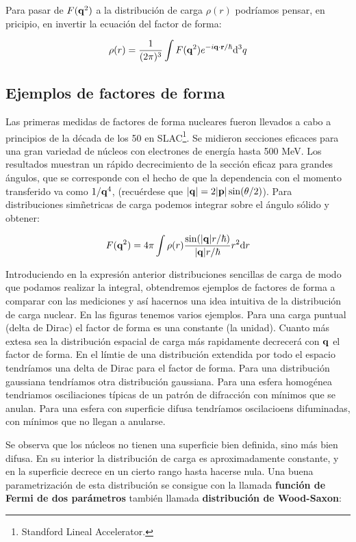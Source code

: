 Para pasar de $F(\mathbf{q}^2)$ a la distribución de carga $\rho(r)$ podríamos pensar, en pricipio, en invertir la ecuación del factor de forma:

\begin{equation}
    \rho(r)=\frac{1}{(2\pi)^3} \int F(\mathbf{q}^2) e^{-i \mathbf{q} \cdot \mathbf{r}/\hbar} \mathrm{d}^3 q
\end{equation}


\subsection{Ejemplos de factores de forma}

Las primeras medidas de factores de forma nucleares fueron llevados a cabo a principios de la década de los 50 en SLAC\footnote{Standford Lineal Accelerator.}. Se midieron secciones eficaces para una gran variedad de núcleos con electrones de energía hasta 500 MeV. Los resultados muestran un rápido decrecimiento de la sección eficaz para grandes ángulos, que se corresponde con el hecho de que la dependencia con el momento transferido va como $1/\mathbf{q}^4$, (recuérdese que $|\mathbf{q}|=2|\mathbf{p}| \sin (\theta /2)$). Para distribuciones simñetricas de carga podemos integrar sobre el ángulo sólido y obtener:

\begin{equation}
	F(\mathbf{q}^2) = 4 \pi \int \rho (r) \frac{\sin (|\mathbf{q}|r/\hbar)}{ |\mathbf{q}| r / \hbar} r^2 \mathrm{d} r
\end{equation}

Introduciendo en la expresión anterior distribuciones sencillas de carga de modo que podamos realizar la integral, obtendremos ejemplos de factores de forma a comparar con las mediciones y así hacernos una idea intuitiva de la distribución de carga nuclear. En las figuras tenemos varios ejemplos. Para una carga puntual (delta de Dirac) el factor de forma es una constante (la unidad). Cuanto más extesa sea la distribución espacial de carga más rapidamente decrecerá con $\mathbf{q}$ el factor de forma. En el límtie de una distribución extendida por todo el espacio tendríamos una delta de Dirac para el factor de forma. Para una distribución gaussiana tendríamos otra distribución gaussiana. Para una esfera homogénea tendriamos osciliaciones típicas de un patrón de difracción con mínimos que se anulan. Para una esfera con superficie difusa tendríamos oscilacioens difuminadas, con mínimos que no llegan a anularse.


Se observa que los núcleos no tienen una superficie bien definida, sino más bien difusa. En su interior la distribución de carga es aproximadamente constante, y en la superficie decrece en un cierto rango hasta hacerse nula. Una buena parametrización de esta distribución se consigue con la llamada \textbf{función de Fermi de dos parámetros} también llamada \textbf{distribución de Wood-Saxon}:

